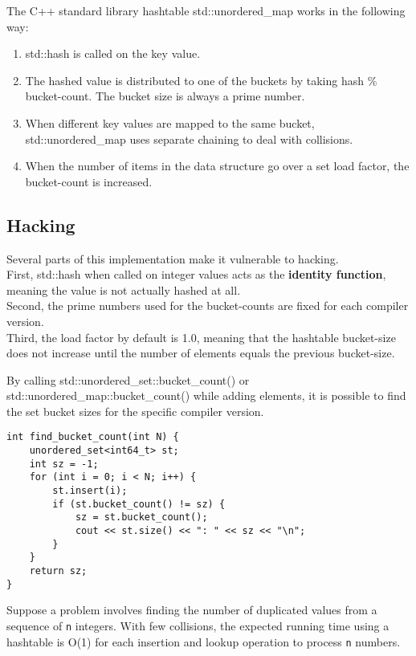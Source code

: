 \documentclass[12pt,a4paper]{article}
\begin{document}
The C++ standard library hashtable std::unordered\_map works in the
following way:\cite{Forisek_2014}
\begin{enumerate}
    \item std::hash is called on the key value.
    \item The hashed value is distributed to one of the buckets by taking hash \%
bucket-count. The bucket size is always a prime number.
    \item When different key values are mapped to the same bucket, std::unordered\_map uses separate chaining to deal with collisions.
    \item When the number of items in the data structure go over a set load factor, the bucket-count is increased.
\end{enumerate}

\subsection{Hacking}\label{hacking}

Several parts of this implementation make it vulnerable to hacking.\\
First, std::hash when called on integer values acts as the
\textbf{identity function}, meaning the value is not actually hashed at
all.\\
Second, the prime numbers used for the bucket-counts are fixed for each
compiler version.\\
Third, the load factor by default is 1.0, meaning that the hashtable
bucket-size does not increase until the number of elements equals the
previous bucket-size.

By calling std::unordered\_set::bucket\_count() or
std::unordered\_map::bucket\_count() while adding elements, it is
possible to find the set bucket sizes for the specific compiler version.

\begin{verbatim}
int find_bucket_count(int N) {
    unordered_set<int64_t> st;
    int sz = -1;
    for (int i = 0; i < N; i++) {
        st.insert(i);
        if (st.bucket_count() != sz) {
            sz = st.bucket_count();
            cout << st.size() << ": " << sz << "\n";
        }
    }
    return sz;
}
\end{verbatim}

Suppose a problem involves finding the number of duplicated values from
a sequence of \texttt{n} integers. With few collisions, the expected
running time using a hashtable is O(1) for each insertion and lookup
operation to process \texttt{n} numbers.
\end{document}
